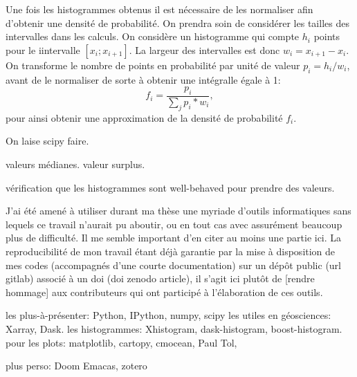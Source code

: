 \documentclass[index]{subfiles}
\begin{document}
Une fois les histogrammes obtenus il est nécessaire de les normaliser afin d'obtenir une densité de probabilité. On prendra soin de considérer les tailles des intervalles dans les calculs.
On considère un histogramme qui compte \(h_{i}\) points pour le i\ieme intervalle \(\left[x_{i}; x_{i+1} \right]\).
La largeur des intervalles est donc \(w_{i} = x_{i+1}-x_{i}\). On transforme le nombre de points en probabilité par unité de valeur \(p_{i} = h_{i} / w_{i} \), avant de le normaliser de sorte à obtenir une intégralle égale à 1:
\begin{equation}
  f_{i} = \frac{p_{i}}{\sum_{j}{p_{i}*w_{i}}},
\end{equation}
pour ainsi obtenir une approximation de la densité de probabilité \(f_{i}\).

On laise scipy faire.

valeurs médianes.
valeur surplus.

vérification que les histogrammes sont well-behaved pour prendre des valeurs.


J'ai été amené à utiliser durant ma thèse une myriade d'outils informatiques sans lequels ce travail n'aurait pu aboutir, ou en tout cas avec assurément beaucoup plus de difficulté.
Il me semble important d'en citer au moins une partie ici.
La reproducibilité de mon travail étant déjà garantie par la mise à disposition de mes codes (accompagnés d'une courte documentation) sur un dépôt public (url gitlab) associé à un doi (doi zenodo article), il s'agit ici plutôt de [rendre hommage] aux contributeurs qui ont participé à l'élaboration de ces outils.

les plus-à-présenter: Python, IPython, numpy, scipy
les utiles en géosciences: Xarray, Dask.
les histogrammes: Xhistogram, dask-histogram, boost-histogram.
pour les plots: matplotlib, cartopy, cmocean, Paul Tol,

plus perso: Doom Emacas, zotero



\biblio
\end{document}
